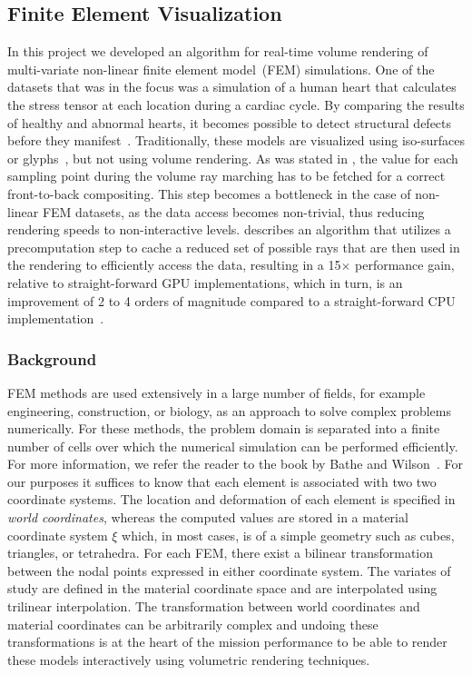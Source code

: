 \subsection{Finite Element Visualization}
\label{contributions:medbio:fem}
In this project we developed an algorithm for real-time volume rendering of multi-variate non-linear finite element model~(FEM) simulations. One of the datasets that was in the focus was a simulation of a human heart that calculates the stress tensor at each location during a cardiac cycle. By comparing the results of healthy and abnormal hearts, it becomes possible to detect structural defects before they manifest~\cite{young1992three, young1995tracking}. Traditionally, these models are visualized using iso-surfaces or glyphs~\cite{wunsche2003visualization}, but not using volume rendering. As was stated in , the value for each sampling point during the volume ray marching has to be fetched for a correct front-to-back compositing. This step becomes a bottleneck in the case of non-linear FEM datasets, as the data access becomes non-trivial, thus reducing rendering speeds to non-interactive levels.  describes an algorithm that utilizes a precomputation step to cache a reduced set of possible rays that are then used in the rendering to efficiently access the data, resulting in a 15$\times$ performance gain, relative to straight-forward GPU implementations, which in turn, is an improvement of 2 to 4 orders of magnitude compared to a straight-forward CPU implementation~\cite{Liu12Fem}. 

\subsubsection{Background}
\label{contributions:medbio:fem:background}
FEM methods are used extensively in a large number of fields, for example engineering, construction, or biology, as an approach to solve complex problems numerically. For these methods, the problem domain is separated into a finite number of cells over which the numerical simulation can be performed efficiently. For more information, we refer the reader to the book by Bathe and Wilson~\cite{bathe1976numerical}. For our purposes it suffices to know that each element is associated with two two coordinate systems. The location and deformation of each element is specified in \emph{world coordinates}, whereas the computed values are stored in a material coordinate system $\xi$ which, in most cases, is of a simple geometry such as cubes, triangles, or tetrahedra. For each FEM, there exist a bilinear transformation between the nodal points expressed in either coordinate system. The variates of study are defined in the material coordinate space and are interpolated using trilinear interpolation. The transformation between world coordinates and material coordinates can be arbitrarily complex and undoing these transformations is at the heart of the mission performance to be able to render these models interactively using volumetric rendering techniques.

